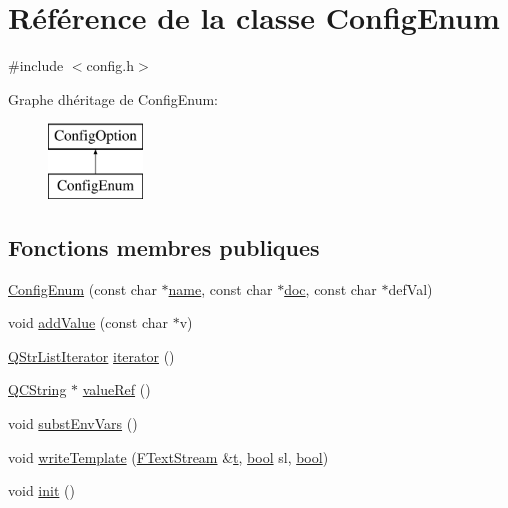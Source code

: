 \hypertarget{class_config_enum}{}\section{Référence de la classe Config\+Enum}
\label{class_config_enum}


{\ttfamily \#include $<$config.\+h$>$}

Graphe d\textquotesingle{}héritage de Config\+Enum\+:\begin{figure}[H]
\begin{center}
\leavevmode
\includegraphics[height=2.000000cm]{class_config_enum}
\end{center}
\end{figure}
\subsection*{Fonctions membres publiques}
\begin{DoxyCompactItemize}
\item 
\hyperlink{class_config_enum_a96e17cf6e6f6e69461f8a19e3f29b421}{Config\+Enum} (const char $\ast$\hyperlink{class_config_option_a2f226c32b0c447c1fa628660f42859c4}{name}, const char $\ast$\hyperlink{vhdljjparser_8cpp_a9910424bf5401d657c3b3fdff6fcc152}{doc}, const char $\ast$def\+Val)
\item 
void \hyperlink{class_config_enum_a6131fd01c26d5adbe380a9a6832c3ff1}{add\+Value} (const char $\ast$v)
\item 
\hyperlink{qstrlist_8h_af2e5d0149074944d84441c323fe79c27}{Q\+Str\+List\+Iterator} \hyperlink{class_config_enum_abcf14150c3349019fe2b703590ad906e}{iterator} ()
\item 
\hyperlink{class_q_c_string}{Q\+C\+String} $\ast$ \hyperlink{class_config_enum_a75b1e30ba1f89523fb342af4ef851a29}{value\+Ref} ()
\item 
void \hyperlink{class_config_enum_a6bce69a7f2e47d115ad136e56aca8158}{subst\+Env\+Vars} ()
\item 
void \hyperlink{class_config_enum_aa739cce5633d2e75298bef0f6cf7c84c}{write\+Template} (\hyperlink{class_f_text_stream}{F\+Text\+Stream} \&\hyperlink{058__bracket__recursion_8tcl_a69e959f6901827e4d8271aeaa5fba0fc}{t}, \hyperlink{qglobal_8h_a1062901a7428fdd9c7f180f5e01ea056}{bool} sl, \hyperlink{qglobal_8h_a1062901a7428fdd9c7f180f5e01ea056}{bool})
\item 
void \hyperlink{class_config_enum_af827841fdcc6612dd7ff2fb6ec92eaad}{init} ()
\end{DoxyCompactItemize}
